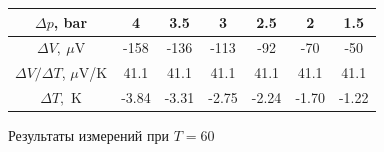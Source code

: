 \documentclass[a4paper,12pt]{report}
\begin{document}
    \begin{figure}[H]
        \centering
        \begin{tabular}{|c|c|c|c|c|c|c|}
            \hline
            $\Delta p$, bar & 4 & 3.5 & 3 & 2.5 & 2 & 1.5 \\
            \hline
            $\Delta V, \ \mu$V & -158 & -136 & -113 & -92 & -70 & -50 \\
            \hline
            $\Delta V/\Delta T$, $\mu\text{V}$/K & 41.1 & 41.1 & 41.1 & 41.1 & 41.1 & 41.1 \\
            \hline
            $\Delta T,$ K & -3.84 & -3.31 & -2.75 & -2.24 & -1.70 & -1.22 \\
            \hline
        \end{tabular}
        \caption{Результаты измерений при $T=60$ \celsius}
    \end{figure}
\end{document}
